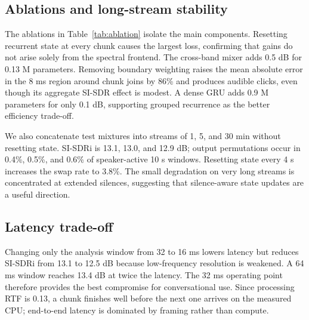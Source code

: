 \subsection{Ablations and long-stream stability}

The ablations in Table~\ref{tab:ablation} isolate the main components.
Resetting recurrent state at every chunk causes the largest loss, confirming
that gains do not arise solely from the spectral frontend.  The cross-band mixer
adds 0.5 dB for 0.13 M parameters.  Removing boundary weighting raises the mean
absolute error in the 8 ms region around chunk joins by 86\% and produces
audible clicks, even though its aggregate SI-SDR effect is modest.  A dense GRU
adds 0.9 M parameters for only 0.1 dB, supporting grouped recurrence as the
better efficiency trade-off.

We also concatenate test mixtures into streams of 1, 5, and 30 min without
resetting state.  SI-SDRi is 13.1, 13.0, and 12.9 dB; output permutations occur
in 0.4\%, 0.5\%, and 0.6\% of speaker-active 10 s windows.  Resetting state every
4 s increases the swap rate to 3.8\%.  The small degradation on very long
streams is concentrated at extended silences, suggesting that silence-aware
state updates are a useful direction.

\subsection{Latency trade-off}

Changing only the analysis window from 32 to 16 ms lowers latency but reduces
SI-SDRi from 13.1 to 12.5 dB because low-frequency resolution is weakened.  A
64 ms window reaches 13.4 dB at twice the latency.  The 32 ms operating point
therefore provides the best compromise for conversational use.  Since processing
RTF is 0.13, a chunk finishes well before the next one arrives on the measured
CPU; end-to-end latency is dominated by framing rather than compute.
